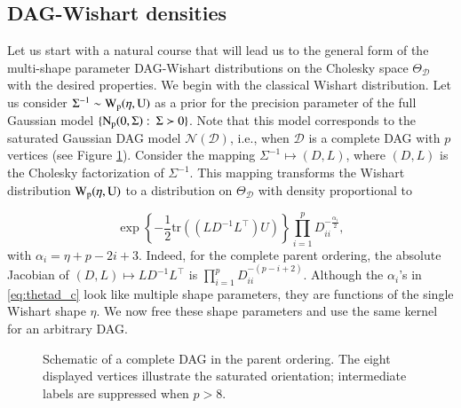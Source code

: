 \documentclass[12pt]{article}
\newcommand{\D}{\mathcal{D}}
\theoremstyle{plain}
\theoremstyle{definition}
\theoremstyle{remark}
\begin{document}
\subsection{DAG-Wishart densities}\label{sub:pit}
Let us start with a natural course that will lead us to the general form of the multi-shape parameter DAG-Wishart distributions on the Cholesky space $\Theta_{\D}$ with the desired properties. We begin with the classical Wishart distribution. Let us  consider $\Sigma^{-1}\sim\rm{W}_{p}(\eta, U)$ as a prior for the precision parameter of the full Gaussian model $\{ \rm{N}_{p}(0, \Sigma): \: \Sigma\succ 0\}$. Note that this model corresponds to the saturated Gaussian DAG model $\mathscr{N}(\D)$, i.e., when $\D$ is a complete DAG with $p$ vertices (see Figure \ref{fig:cdag}). Consider the mapping $\Sigma^{-1}\mapsto (D, L)$, where $(D, L)$ is the Cholesky factorization of $\Sigma^{-1}$. This mapping transforms the Wishart distribution  $\rm{W}_{p}(\eta, U)$ to a distribution on $\Theta_{\D}$ with density  proportional to
 
\begin{equation}\label{eq:thetad_c}
 \exp\left\{-\frac12\mathrm{tr}\left( \left(LD^{-1}L^{\top}\right)U\right)\right\}\prod_{i=1}^{p}D_{ii}^{-\frac{\alpha_i}{2}},
\end{equation}
with $\alpha_i=\eta+p-2i+3$.  Indeed, for the complete parent ordering,
the absolute Jacobian of \((D,L)\mapsto LD^{-1}L^\top\) is
\(\prod_{i=1}^{p}D_{ii}^{-(p-i+2)}\).  Although the
\(\alpha_i\)'s in \eqref{eq:thetad_c} look like multiple shape
parameters, they are functions of the single Wishart shape \(\eta\).
We now free these shape parameters and use the same kernel for an
arbitrary DAG.

\begin{figure}[htbp]
  \centering
  \caption{Schematic of a complete DAG in the parent ordering.  The eight
  displayed vertices illustrate the saturated orientation; intermediate
  labels are suppressed when $p>8$.}
  \label{fig:cdag}
\end{figure}
 
\end{document}
